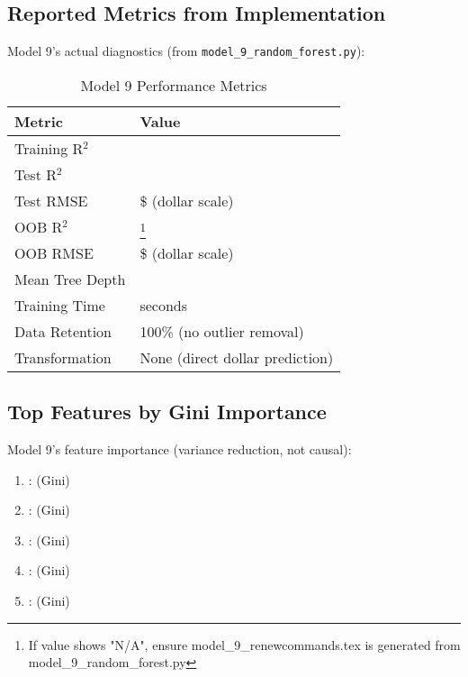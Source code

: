 \subsection{Reported Metrics from Implementation}
Model 9's actual diagnostics (from \texttt{model\_9\_random\_forest.py}):
\begin{table}[h]
\centering
\caption{Model 9 Performance Metrics}
\begin{tabular}{ll}
\toprule
\textbf{Metric} & \textbf{Value} \\
\midrule
Training R$^2$ & \ModelNineRSquaredTrain{} \\
Test R$^2$ & \ModelNineRSquaredTest{} \\
Test RMSE & \$\ModelNineRMSETest{} (dollar scale) \\
OOB R$^2$ & \ModelNineOOBRSquared{}\footnote{If value shows "N/A", ensure model\_9\_renewcommands.tex is generated from model\_9\_random\_forest.py} \\
OOB RMSE & \$\ModelNineOOBError{} (dollar scale) \\
Mean Tree Depth & \ModelNineMeanTreeDepth{} \\
Training Time & \ModelNineTrainingTime{} seconds \\
Data Retention & 100\% (no outlier removal) \\
Transformation & None (direct dollar prediction) \\
\bottomrule
\end{tabular}
\label{tab:model9_metrics}
\end{table}

\subsection{Top Features by Gini Importance}

Model 9's feature importance (variance reduction, not causal):

\begin{enumerate}
    \item \ModelNineTopFeatureOne{}: \ModelNineTopFeatureOneImportance{} (Gini)
    \item \ModelNineTopFeatureTwo{}: \ModelNineTopFeatureTwoImportance{} (Gini)
    \item \ModelNineTopFeatureThree{}: \ModelNineTopFeatureThreeImportance{} (Gini)
    \item \ModelNineTopFeatureFour{}: \ModelNineTopFeatureFourImportance{} (Gini)
    \item \ModelNineTopFeatureFive{}: \ModelNineTopFeatureFiveImportance{} (Gini)
\end{enumerate}

